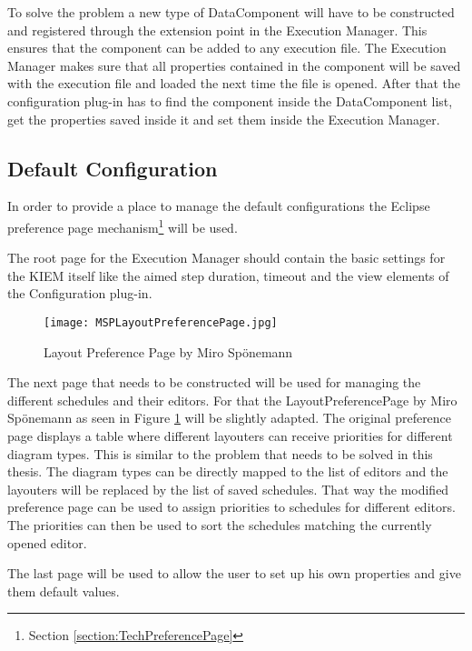 To solve the problem a new type of DataComponent will have to be constructed and registered through
the extension point in the Execution Manager. This ensures that the component can be added to any execution
file. The Execution Manager makes sure that all properties contained in the component will be saved with
the execution file and loaded the next time the file is opened. After that the configuration plug-in has to
find the component inside the DataComponent list, get the properties saved inside it
and set them inside the Execution Manager.

\subsection{Default Configuration}
\label{section:ConfConceptsDefaultConf}
In order to provide a place to manage the default configurations the Eclipse 
preference page mechanism\footnote{Section \ref{section:TechPreferencePage}}
will be used.

The root page for the Execution Manager should contain the basic settings for the \ac{KIEM} itself like
the aimed step duration, timeout and the view elements of the Configuration plug-in.

\begin{figure}
  \centering
  \texttt{[image: MSPLayoutPreferencePage.jpg]}
  \caption[Layout Preference Page by Miro Sp\"onemann]%
  {Layout Preference Page by Miro Sp\"onemann\protect}
  \label{fig:MSPLayoutPreferencePage}
\end{figure}

The next page that needs to be constructed will be used for managing the different schedules
and their editors. For that the LayoutPreferencePage by Miro Sp\"onemann
as seen in Figure \ref{fig:MSPLayoutPreferencePage} will be slightly adapted. The original preference page
displays a table where different layouters can receive priorities for different diagram
types. This is similar to the problem that needs to be solved in this thesis. The diagram types
can be directly mapped to the list of editors and the layouters will be replaced by the list of saved schedules.
That way the modified preference page can be used to assign priorities to schedules for
different editors. The priorities can then be used to sort the schedules matching
the currently opened editor.

The last page will be used to allow the user to set up his own properties and give them
default values.

